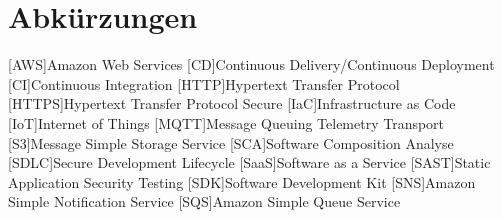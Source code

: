 \chapter*{Abkürzungen}

\begin{acronym}
    [AWS]{Amazon Web Services}
    [CD]{Continuous Delivery/Continuous Deployment}
    [CI]{Continuous Integration}
    [HTTP]{Hypertext Transfer Protocol}
    [HTTPS]{Hypertext Transfer Protocol Secure}    
    [IaC]{Infrastructure as Code}
    [IoT]{Internet of Things}
    [MQTT]{Message Queuing Telemetry Transport}
    [S3]{Message Simple Storage Service}
    [SCA]{Software Composition Analyse}
    [SDLC]{Secure Development Lifecycle}
    [SaaS]{Software as a Service}
    [SAST]{Static Application Security Testing}  
    [SDK]{Software Development Kit}
    [SNS]{Amazon Simple Notification Service}
    [SQS]{Amazon Simple Queue Service}
\end{acronym}
